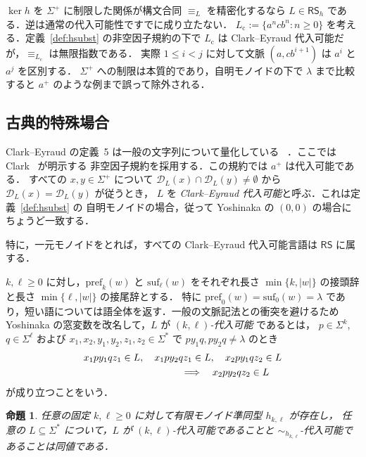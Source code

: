 \documentclass[11pt,a4paper]{ltjsarticle}
\newtheorem{proposition}[theorem]{命題}
\theoremstyle{remark}
\theoremstyle{plain}
\newcommand{\D}{\mathcal{D}}
\newcommand{\pref}{\mathrm{pref}}
\newcommand{\suf}{\mathrm{suf}}
\begin{document}
$\ker h$ を $\Sigma^+$ に制限した関係が構文合同 $\equiv_L$ を精密化するなら
$L\in\mathsf{RS}_h$ である．逆は通常の代入可能性ですでに成り立たない．
$L_{\mathrm c}:=\{a^ncb^n:n\ge0\}$ を考える．定義~\ref{def:hsubst} の非空因子規約の下で
$L_{\mathrm c}$ は Clark--Eyraud 代入可能だが，$\equiv_{L_{\mathrm c}}$ は無限指数である．
実際 $1\le i<j$ に対して文脈 $(a,cb^{i+1})$ は $a^i$ と $a^j$ を区別する．
$\Sigma^+$ への制限は本質的であり，自明モノイドの下で $\lambda$ まで比較すると
$a^+$ のような例まで誤って除外される．

\subsection{古典的特殊場合}

Clark--Eyraud の定義~5 は一般の文字列について量化している
~\cite{clark-eyraud2007}．ここでは Clark~\cite{clark2013} が明示する
非空因子規約を採用する．この規約では $a^+$ は代入可能である．
すべての $x,y\in\Sigma^+$ について
$\D_L(x)\cap\D_L(y)\ne\emptyset$ から $\D_L(x)=\D_L(y)$ が従うとき，
$L$ を \emph{Clark--Eyraud 代入可能}と呼ぶ．これは定義~\ref{def:hsubst} の
自明モノイドの場合，従って Yoshinaka の $(0,0)$ の場合にちょうど一致する．

特に，一元モノイドをとれば，すべての Clark--Eyraud 代入可能言語は
$\mathsf{RS}$ に属する．

$k,\ell\ge0$ に対し，$\pref_k(w)$ と $\suf_\ell(w)$ をそれぞれ長さ
$\min\{k,|w|\}$ の接頭辞と長さ $\min\{\ell,|w|\}$ の接尾辞とする．
特に $\pref_0(w)=\suf_0(w)=\lambda$ であり，短い語については語全体を返す．一般の文脈記法との衝突を避けるため
Yoshinaka の窓変数を改名して，$L$ が \emph{$(k,\ell)$-代入可能} であるとは，
$p\in\Sigma^k$, $q\in\Sigma^\ell$ および
$x_1,x_2,y_1,y_2,z_1,z_2\in\Sigma^*$ で $py_1q,py_2q\ne\lambda$ のとき
\[
\begin{split}
&x_1py_1qz_1\in L,\quad x_1py_2qz_1\in L,\quad
x_2py_1qz_2\in L\\
&\hspace{35mm}\Longrightarrow\quad x_2py_2qz_2\in L
\end{split}
\]
が成り立つことをいう．

\begin{proposition}\label{prop:yl-special}
任意の固定 $k,\ell\ge0$ に対して有限モノイド準同型 $h_{k,\ell}$ が存在し，
任意の $L\subseteq\Sigma^*$ について，$L$ が $(k,\ell)$-代入可能であることと
$\sim_{h_{k,\ell}}$-代入可能であることは同値である．
\end{proposition}
\end{document}
